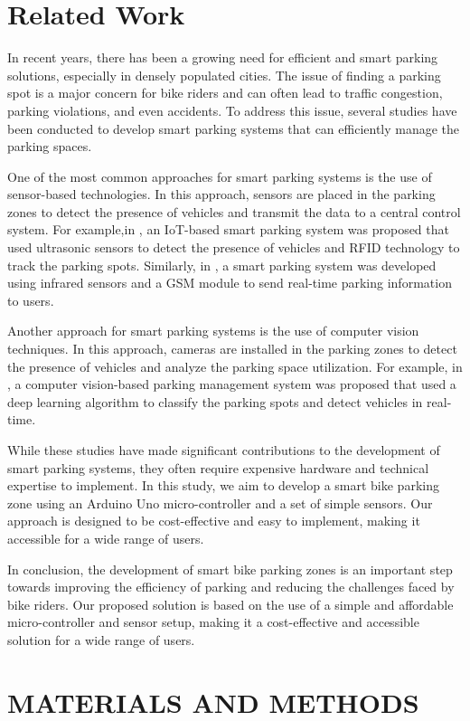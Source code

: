 \documentclass[conference]{IEEEtran}
\begin{document}
	\section{Related Work}
	In recent years, there has been a growing need for efficient and smart parking solutions, especially in densely populated cities. The issue of finding a parking spot is a major concern for bike riders and can often lead to traffic congestion, parking violations, and even accidents. To address this issue, several studies have been conducted to develop smart parking systems that can efficiently manage the parking spaces.
	
	One of the most common approaches for smart parking systems is the use of sensor-based technologies. In this approach, sensors are placed in the parking zones to detect the presence of vehicles and transmit the data to a central control system. For example,in \cite{b1}, an IoT-based smart parking system was proposed that used ultrasonic sensors to detect the presence of vehicles and RFID technology to track the parking spots. Similarly, in \cite{b2}, a smart parking system was developed using infrared sensors and a GSM module to send real-time parking information to users.
	
	Another approach for smart parking systems is the use of computer vision techniques. In this approach, cameras are installed in the parking zones to detect the presence of vehicles and analyze the parking space utilization. For example, in \cite{b3}, a computer vision-based parking management system was proposed that used a deep learning algorithm to classify the parking spots and detect vehicles in real-time.
	
	While these studies have made significant contributions to the development of smart parking systems, they often require expensive hardware and technical expertise to implement. In this study, we aim to develop a smart bike parking zone using an Arduino Uno micro-controller and a set of simple sensors. Our approach is designed to be cost-effective and easy to implement, making it accessible for a wide range of users.
	
	In conclusion, the development of smart bike parking zones is an important step towards improving the efficiency of parking and reducing the challenges faced by bike riders. Our proposed solution is based on the use of a simple and affordable micro-controller and sensor setup, making it a cost-effective and accessible solution for a wide range of users.
	
	\section{MATERIALS AND METHODS}
	
\end{document}
